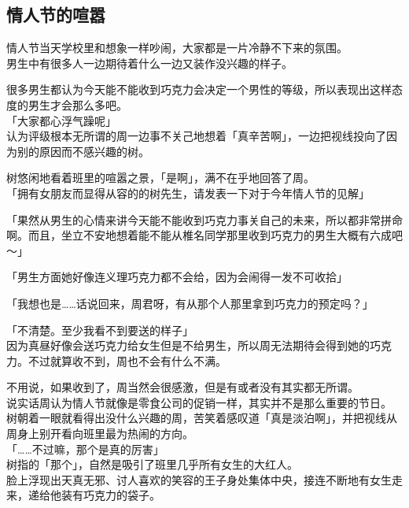 \subsection{情人节的喧嚣}

情人节当天学校里和想象一样吵闹，大家都是一片冷静不下来的氛围。\\

男生中有很多人一边期待着什么一边又装作没兴趣的样子。

很多男生都认为今天能不能收到巧克力会决定一个男性的等级，所以表现出这样态度的男生才会那么多吧。\\

「大家都心浮气躁呢」\\

认为评级根本无所谓的周一边事不关己地想着「真辛苦啊」，一边把视线投向了因为别的原因而不感兴趣的树。

树悠闲地看着班里的喧嚣之景，「是啊」，满不在乎地回答了周。\\

「拥有女朋友而显得从容的的树先生，请发表一下对于今年情人节的见解」

「果然从男生的心情来讲今天能不能收到巧克力事关自己的未来，所以都非常拼命啊。而且，坐立不安地想着能不能从椎名同学那里收到巧克力的男生大概有六成吧～」

「男生方面她好像连义理巧克力都不会给，因为会闹得一发不可收拾」

「我想也是……话说回来，周君呀，有从那个人那里拿到巧克力的预定吗？」

「不清楚。至少我看不到要送的样子」\\

因为真昼好像会送巧克力给女生但是不给男生，所以周无法期待会得到她的巧克力。不过就算收不到，周也不会有什么不满。

不用说，如果收到了，周当然会很感激，但是有或者没有其实都无所谓。\\

说实话周认为情人节就像是零食公司的促销一样，其实并不是那么重要的节日。\\

树朝着一眼就看得出没什么兴趣的周，苦笑着感叹道「真是淡泊啊」，并把视线从周身上别开看向班里最为热闹的方向。\\

「……不过嘛，那个是真的厉害」\\

树指的「那个」，自然是吸引了班里几乎所有女生的大红人。\\

脸上浮现出天真无邪、讨人喜欢的笑容的王子身处集体中央，接连不断地有女生走来，递给他装有巧克力的袋子。

